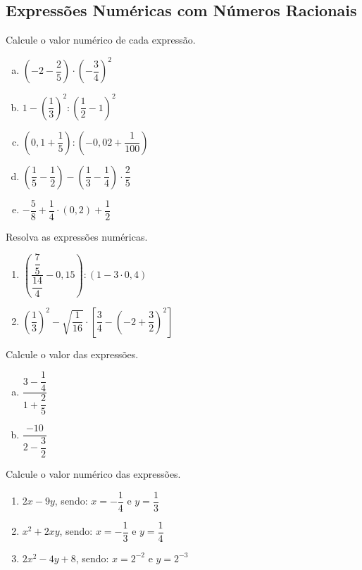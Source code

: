 \subsection{Expressões Numéricas com Números Racionais}

\item Calcule o valor numérico de cada expressão.
\begin{multicols}{2}
\begin{enumerate}[a)]
	\item $\left(-2 - \dfrac{2}{5}\right)\cdot \left(-\dfrac{3}{4}\right)^2$
	\item $1-\left(\dfrac{1}{3}\right)^2:\left(\dfrac{1}{2}-1\right)^2$
	\item $\left(0,1+\dfrac{1}{5}\right):\left(-0,02+\dfrac{1}{100}\right)$
	\item $\left(\dfrac{1}{5} - \dfrac{1}{2}\right) - \left(\dfrac{1}{3} - \dfrac{1}{4}\right)\cdot \dfrac{2}{5}$
	\item $-\dfrac{5}{8} + \dfrac{1}{4}\cdot(0,2) + \dfrac{1}{2} $
\end{enumerate}
\end{multicols}

\item Resolva as expressões numéricas.
\begin{enumerate}
	\item $\left(\dfrac{\dfrac{7}{5}}{\dfrac{14}{4}} - 0,15\right) : (1 -3 \cdot 0,4)$
	\item $\left(\dfrac{1}{3}\right)^2 - \sqrt{\dfrac{1}{16}}\cdot \left[\dfrac{3}{4} - \left(-2 + \dfrac{3}{2}\right)^2\right]$
\end{enumerate}

\item Calcule o valor das expressões.
\begin{multicols}{2}
\begin{enumerate}[a)]
	\item $\dfrac{3 - \dfrac{1}{4}}{1 + \dfrac{2}{5}}$
	\item $\dfrac{-10}{2 - \dfrac{3}{2}}$
\end{enumerate}
\end{multicols}

\item Calcule o valor numérico das expressões.
\begin{enumerate}
	\item $2x-9y$, sendo: $x = -\dfrac{1}{4}$ e $y = \dfrac{1}{3}$
	\item $x^2 + 2xy$, sendo: $x = -\dfrac{1}{3}$ e $y = \dfrac{1}{4}$
	\item $2x^2 - 4y + 8$, sendo: $x = 2^{-2}$ e $y = 2^{-3}$
\end{enumerate}

